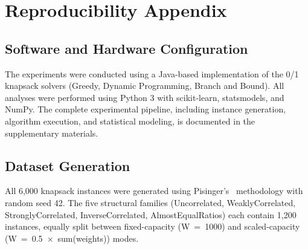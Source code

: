 \documentclass[sigconf]{acmart}
\begin{document}



\appendix

\section{Reproducibility Appendix}

\subsection{Software and Hardware Configuration}
The experiments were conducted using a Java-based implementation of the 0/1 knapsack solvers (Greedy, Dynamic Programming, Branch and Bound). All analyses were performed using Python 3 with scikit-learn, statsmodels, and NumPy. The complete experimental pipeline, including instance generation, algorithm execution, and statistical modeling, is documented in the supplementary materials.

\subsection{Dataset Generation}
All 6,000 knapsack instances were generated using Pisinger's~\cite{Pisinger2005} methodology with random seed 42. The five structural families (Uncorrelated, WeaklyCorrelated, StronglyCorrelated, InverseCorrelated, AlmostEqualRatios) each contain 1,200 instances, equally split between fixed-capacity (W~=~1000) and scaled-capacity (W~=~0.5~$\times$~sum(weights)) modes.
\end{document}

